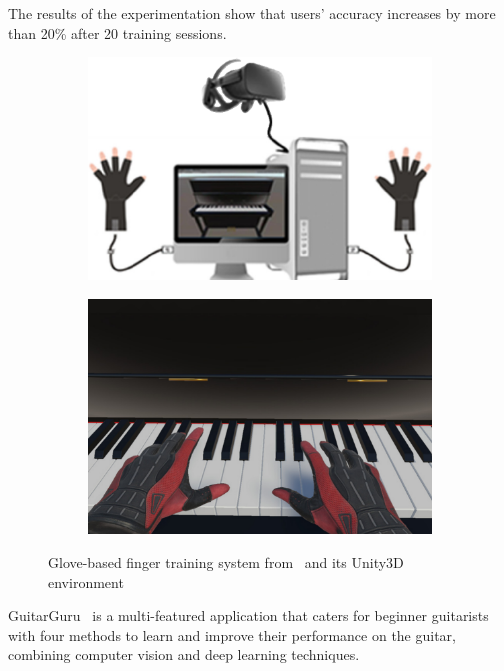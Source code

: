 The results of the experimentation show that users' accuracy increases by more than 20\% after 20 training sessions.

\begin{figure}[ht]
	\centering
	\begin{subfigure}{0.49\textwidth}
		\centering
		\includegraphics[width=\textwidth]{images/related-work/piano-glove}
	\end{subfigure}
	\hfill
	\begin{subfigure}{0.49\textwidth}
		\centering
		\includegraphics[width=\textwidth]{images/related-work/piano-glove-unity}
	\end{subfigure}
	\caption{Glove-based finger training system from~\protect\cite{piano-glove-training} and its Unity3D environment}
	\label{fig:piano-glove-training}
\end{figure}

GuitarGuru~\cite{guitar-guru} is a multi-featured application that caters for beginner guitarists with four
methods to learn and improve their performance on the guitar, combining computer vision and deep learning techniques.

